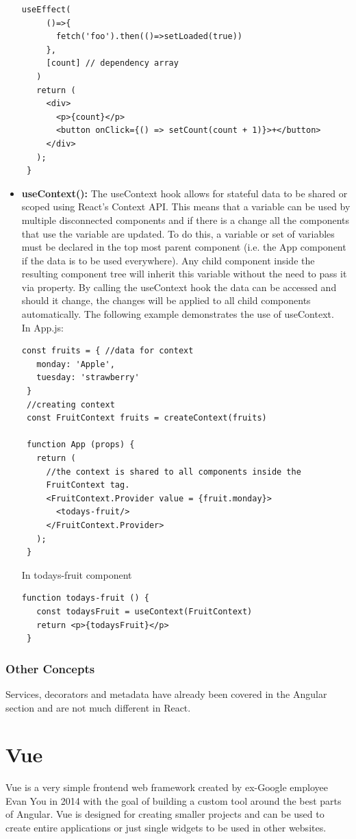 \begin{itemize}
\begin{Verbatim}[frame=single]
   useEffect(
     ()=>{
       fetch('foo').then(()=>setLoaded(true))
     },
     [count] // dependency array
   )
   return (
     <div>
       <p>{count}</p>		            
       <button onClick={() => setCount(count + 1)}>+</button>
     </div>
   );
 }
\end{Verbatim}
\pagebreak
\item \textbf{useContext():} The useContext hook allows for stateful data to be shared or scoped using React's Context API. This means that a variable can be used by multiple disconnected components and if there is a change all the components that use the variable are updated. To do this, a variable or set of variables must be declared in the top most parent component (i.e. the App component if the data is to be used everywhere). Any child component inside the resulting component tree will inherit this variable without the need to pass it via property. By calling the useContext hook the data can be accessed and should it change, the changes will be applied to all child components automatically. The following example demonstrates the use of useContext.\\[0.5cm]
In App.js:
\begin{Verbatim}[frame=single]
 const fruits = { //data for context
   monday: 'Apple',
   tuesday: 'strawberry'
 }
 //creating context
 const FruitContext fruits = createContext(fruits)

 function App (props) {
   return (
     //the context is shared to all components inside the
     FruitContext tag.
     <FruitContext.Provider value = {fruit.monday}>
       <todays-fruit/>
     </FruitContext.Provider>
   );  
 }
\end{Verbatim}
In todays-fruit component
\begin{Verbatim}[frame=single]
 function todays-fruit () {
   const todaysFruit = useContext(FruitContext)
   return <p>{todaysFruit}</p>
 }
\end{Verbatim}
\end{itemize}

\subsubsection{Other Concepts}
Services, decorators and metadata have already been covered in the Angular section and are not much different in React.
\section{Vue}
Vue is a very simple frontend web framework created by ex-Google employee Evan You in 2014 with the goal of building a custom tool around the best parts of Angular. Vue is designed for creating smaller projects and can be used to create entire applications or just single widgets to be used in other websites.

